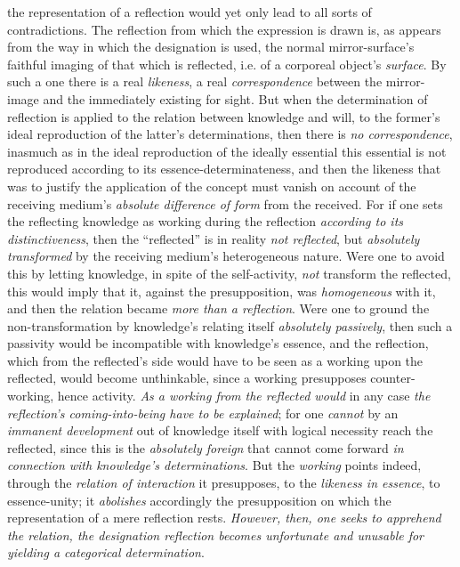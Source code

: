 \documentclass[12pt,a4paper]{book}
\begin{document}
the representation of a reflection would yet only lead to all sorts of contradictions. The reflection from
which the expression is drawn is, as appears from the way in which the designation is used, the normal
mirror-surface's faithful imaging of that which is reflected, i.e. of a corporeal object's \emph{surface}. By such
a one there is a real \emph{likeness}, a real \emph{correspondence} between the mirror-image and the
immediately existing for sight. But when the determination of reflection is applied to the relation between
knowledge and will, to the former's ideal reproduction of the latter's determinations, then there is \emph{no
correspondence}, inasmuch as in the ideal reproduction of the ideally essential this essential is not
reproduced according to its essence-determinateness, and then the likeness that was to justify the
application of the concept must vanish on account of the receiving medium's \emph{absolute difference of
form} from the received. For if one sets the reflecting knowledge as working during the reflection \emph{according
to its distinctiveness}, then the ``reflected'' is in reality \emph{not reflected}, but \emph{absolutely transformed} by the
receiving medium's heterogeneous nature. Were one to avoid this by letting knowledge, in spite of the
self-activity, \emph{not} transform the reflected, this would imply that it, against the presupposition, was
\emph{homogeneous} with it, and then the relation became \emph{more than a reflection}. Were one to ground the
non-transformation by knowledge's relating itself \emph{absolutely passively}, then such a passivity would be
incompatible with knowledge's essence, and the reflection, which from the reflected's side would have to be
seen as a working upon the reflected, would become unthinkable, since a working presupposes counter-working,
hence activity. \emph{As a working from the reflected would} in any case \emph{the reflection's coming-into-being
have to be explained}; for one \emph{cannot} by an \emph{immanent development} out of knowledge itself with logical necessity
reach the reflected, since this is the \emph{absolutely foreign} that cannot come forward \emph{in connection with
knowledge's determinations}. But the \emph{working} points indeed, through the \emph{relation of interaction} it
presupposes, to the \emph{likeness in essence}, to essence-unity; it \emph{abolishes} accordingly the presupposition on
which the representation of a mere reflection rests. \emph{However, then, one seeks to apprehend the relation, the
designation reflection becomes unfortunate and unusable for yielding a categorical determination}.
\end{document}
